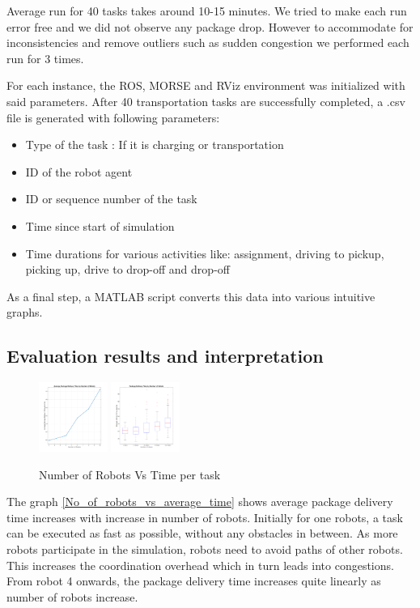 \documentclass[journal]{IEEEtran}
\begin{document}
Average run for 40 tasks takes around 10-15 minutes. We tried to make each run error free and we did not observe any package drop. However to accommodate for inconsistencies and remove outliers such as sudden congestion we performed each run for 3 times. 

For each instance, the ROS, MORSE and RViz environment was initialized with said parameters. After 40 transportation tasks are successfully completed, a .csv file is generated with following parameters:
\begin{itemize}
\item Type of the task : If it is charging or transportation
\item ID of the robot agent  
\item ID or sequence number of the task
\item Time since start of simulation
\item Time durations for various activities like: assignment, driving to pickup, picking up, drive to drop-off and drop-off 
\end{itemize}

As a final step, a MATLAB script converts this data into various intuitive graphs. 

\subsection{Evaluation results and interpretation}
\begin{figure}[h]
\includegraphics[width=0.20\textwidth]{resources/graphs/graph2.png}
\label{No_of_robots_vs_average_time}
\includegraphics[width=0.20\textwidth]{resources/graphs/graph1.png}
\label{No_of_robots_vs_time_whiskers}
\caption{Number of Robots Vs Time per task}
\end{figure}

The graph \ref{No_of_robots_vs_average_time} shows average package delivery time increases with increase in number of robots.  Initially for one robots, a task can be executed as fast as possible, without any obstacles in between. As more robots participate in the simulation, robots need to avoid paths of other robots. This increases the coordination overhead which in turn leads into congestions. From robot 4 onwards, the package delivery time increases quite linearly as number of robots increase.
\end{document}
